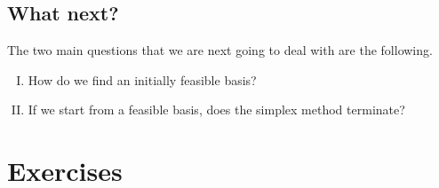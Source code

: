 \subsection{What  next?}
\label{sec:further-questions}
 The two main questions that we
are next going to deal with   are the following.  
\begin{enumerate}[I)]
\item How do we find an initially feasible basis? \label{item:8}
\item If we start from a feasible basis, does the simplex method
  terminate? \label{item:9} 
\end{enumerate}




\section{Exercises}


